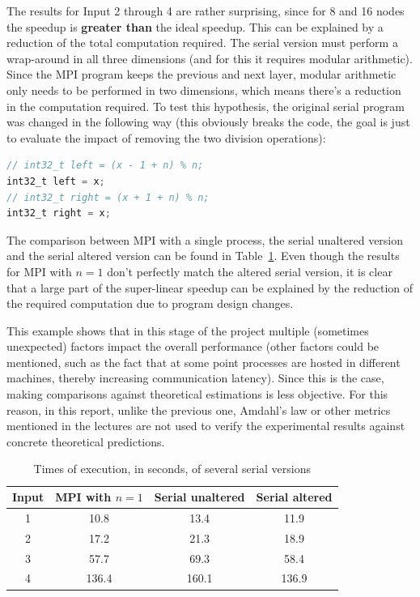 \documentclass{article}
\begin{document}
The results for Input 2 through 4 are rather surprising, since for 8 and 16 nodes
the speedup is \textbf{greater than} the ideal speedup. This can be explained
by a reduction of the total computation required. The serial version must perform a
wrap-around in all three dimensions (and for this it requires modular arithmetic).
Since the MPI program keeps the
previous and next layer, modular arithmetic only needs to be performed in two
dimensions, which means there's a reduction in the computation required. To test this hypothesis,
the original serial program was changed in the following way (this
obviously breaks the code, the goal is just to evaluate the impact of removing the
two division operations):

\begin{lstlisting}[language=C,caption={Change to serial code}]
// int32_t left = (x - 1 + n) % n;
int32_t left = x;
// int32_t right = (x + 1 + n) % n;
int32_t right = x;
\end{lstlisting}

The comparison between MPI with a single process, the serial unaltered version
and the serial altered version can be found in Table~\ref{tbl:serial-times}.
Even though the results for MPI with $n=1$ don't perfectly match the altered serial
version, it is clear that a large part of the super-linear speedup can be explained
by the reduction of the required computation due to program design changes.

This example shows that in this stage of the project multiple (sometimes unexpected)
factors impact the overall performance (other factors could be mentioned, such as the
fact that at some point processes are hosted in different machines, thereby increasing
communication latency). Since this is the case, making comparisons against theoretical estimations is
less objective.
For this reason, in this report, unlike the previous one, Amdahl's law or other metrics
mentioned in the lectures are not used to verify the experimental results against
concrete theoretical predictions.

\begin{table}[h!]
	\centering
	\begin{tabular}{||c c c c||} 
	 \hline
	 Input & MPI with $n=1$ & Serial unaltered & Serial altered \\ [0.5ex] 
	 \hline
	 1 & 10.8 & 13.4 & 11.9 \\  [1ex] 
	 2 & 17.2 & 21.3 & 18.9 \\  [1ex] 
	 3 & 57.7 & 69.3 & 58.4 \\  [1ex] 
	 4 & 136.4 & 160.1 & 136.9 \\  [1ex] 
	 \hline
	\end{tabular}
	\caption{Times of execution, in seconds, of several serial versions}
	\label{tbl:serial-times}
\end{table}
\end{document}
